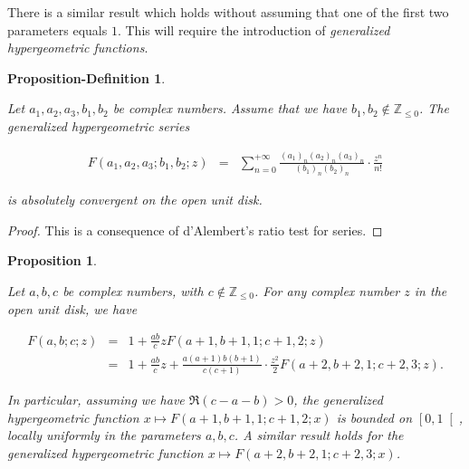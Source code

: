 \documentclass{jams-l}
\newtheorem{proposition}[theorem]{Proposition}
\newtheorem{proposition-definition}[theorem]{Proposition-Definition}
\theoremstyle{definition}
\theoremstyle{remark}
\numberwithin{equation}{section}
\begin{document}
            There is a similar result which holds without assuming that one of the first two parameters equals $1$. This will require the introduction of \textit{generalized hypergeometric functions}.
            
            \begin{proposition-definition}
            \label{DefGeneralizedHypergeometric}
                    
                Let $a_1, a_2, a_3, b_1, b_2$ be complex numbers. Assume that we have $b_1, b_2 \not \in \mathbb{Z}_{\leqslant 0}$. The generalized hypergeometric series
                
                \[ \begin{array}{lll}
                        F \left( a_1, a_2, a_3; b_1, b_2; z \right) & = & \sum\limits_{n = 0}^{+ \infty} \frac{\left( a_1 \right)_n \left( a_2 \right)_n \left( a_3 \right)_n}{\left( b_1 \right)_n \left( b_2 \right)_n} \cdot \frac{z^n}{n!}
                    \end{array} \]
                
                \noindent is absolutely convergent on the open unit disk.
                    
            \end{proposition-definition}
            
            \begin{proof}
            
                This is a consequence of d'Alembert's ratio test for series.
            
            \end{proof}
            
            \begin{proposition}
            \label{PropExtractionTermsGeneralizedHypergeometric}
                    
                Let $a, b, c$ be complex numbers, with $c \not \in \mathbb{Z}_{\leqslant 0}$. For any complex number $z$ in the open unit disk, we have
                
                \[ \begin{array}{lll}
                        F \left( a, b; c; z \right) & = & 1 + \frac{ab}{c} z F \left( a+1, b+1, 1; c+1, 2; z \right) \\[1em]
                        
                        & = & 1 + \frac{a b}{c} z + \frac{a \left( a + 1 \right) b \left( b + 1 \right)}{c \left( c + 1 \right)} \cdot \frac{z^2}{2} F \left( a + 2, b + 2, 1; c + 2, 3; z \right).
                    \end{array} \]
                
                \noindent In particular, assuming we have $\Re \left( c - a - b \right) > 0$, the generalized hypergeometric function $x \longmapsto F \left( a + 1, b + 1, 1; c + 1, 2; x \right)$ is bounded on $\left[ 0, 1 \right[$, locally uniformly in the parameters $a, b, c$. A similar result holds for the generalized hypergeometric function $x \longmapsto F \left( a + 2, b + 2, 1; c + 2, 3; x \right)$.
                    
            \end{proposition}
            
\end{document}
